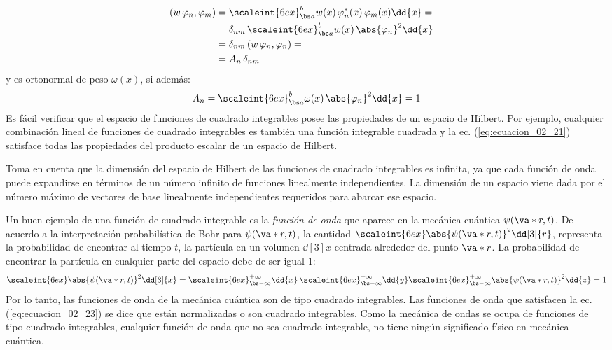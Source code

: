 \begin{align*}
(w \, \varphi_{n}, \varphi_{m}) &= \scaleint{6ex}_{\bs a}^{b} w(x) \,  \varphi_{n}^{*} (x) \, \varphi_{m} (x) \dd{x} = \\
&=\delta_{nm} \, \scaleint{6ex}_{\bs a}^{b} w(x) \, \abs{\varphi_{n}}^{2} \dd{x} = \\
&= \delta_{nm} \, (w \, \varphi_{n}, \varphi_{n}) = \\
&= A_{n} \, \delta_{nm}
\end{align*}
y es ortonormal de peso $\omega (x)$, si además:
\begin{align*}
A_{n} = \scaleint{6ex}_{\bs a}^{b} \omega (x) \, \abs{\varphi_{n}}^{2} \dd{x} = 1
\end{align*}
\vfill{}
Es fácil verificar que el espacio de funciones de cuadrado integrables posee las propiedades de un espacio de Hilbert. Por ejemplo, cualquier combinación lineal de funciones de cuadrado integrables es también una función integrable cuadrada y la ec. (\ref{eq:ecuacion_02_21}) satisface todas las propiedades del producto escalar de un espacio de Hilbert.
\par
Toma en cuenta que la dimensión del espacio de Hilbert de las funciones de cuadrado integrables es infinita, ya que cada función de onda puede expandirse en términos de un número infinito de funciones linealmente independientes. La dimensión de un espacio viene dada por el número máximo de vectores de base linealmente independientes requeridos para abarcar ese espacio.
\par
Un buen ejemplo de una función de cuadrado integrable es la \emph{función de onda} que aparece en la mecánica cuántica $\psi (\va*{r}, t)$. De acuerdo a la interpretación probabilística de Bohr para $\psi (\va*{r}, t)$, la cantidad $\scaleint{6ex} \abs{\psi (\va*{r}, t)}^{2} \dd[3]{r}$, representa la probabilidad de encontrar al tiempo $t$, la partícula en un volumen $\dd[3]{x}$ centrada alrededor del punto $\va*{r}$. La probabilidad de encontrar la partícula en cualquier parte del espacio debe de ser igual $1$:
\begin{align}
\scaleint{6ex} \abs{\psi (\va*{r}, t)}^{2} \dd[3]{x} = \scaleint{6ex}_{\bs -\infty}^{+\infty} \dd{x} \, \scaleint{6ex}_{\bs -\infty}^{+\infty} \dd{y} \scaleint{6ex}_{\bs -\infty}^{+\infty} \abs{\psi (\va*{r}, t)}^{2} \dd{z} = 1
\label{eq:ecuacion_02_23}
\end{align}
Por lo tanto, las funciones de onda de la mecánica cuántica son de tipo cuadrado integrables. Las funciones de onda que satisfacen la ec. (\ref{eq:ecuacion_02_23}) se dice que están normalizadas o son cuadrado integrables. Como la mecánica de ondas se ocupa de funciones de tipo cuadrado integrables, cualquier función de onda que no sea cuadrado integrable, no tiene ningún significado físico en mecánica cuántica.

